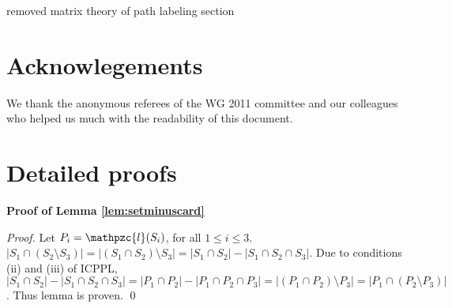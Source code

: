 \documentclass[a4paper,UKenglish,numberwithinsect]{lipics} %
\def\cl{\mathpzc{l}}
\def\lndisplay{1}
\begin{document}
{%
}{removed matrix theory of path labeling section}


\section {Acknowlegements} 
We thank the anonymous referees of the WG 2011 committee and our
colleagues who helped us much with the readability of this document.


%




\appendix

\section{Detailed proofs}
{\bf Proof of Lemma \ref{lem:setminuscard}}
\begin{proof}
  Let $P_i = \cl(S_i)$, for all $1 \le i \le  3$.
  $|S_1 \cap (S_2 \setminus S_3)| = |(S_1 \cap S_2) \setminus S_3| =
  |S_1 \cap S_2| - |S_1 \cap S_2 \cap S_3|$. Due to conditions (ii)
  and (iii) of ICPPL, $|S_1 \cap S_2| - |S_1 \cap S_2 \cap S_3| = |P_1
  \cap P_2| - |P_1 \cap P_2 \cap P_3| = |(P_1 \cap P_2) \setminus P_3|
  = |P_1 \cap (P_2 \setminus P_3)|$. Thus lemma is proven. \qed
\end{proof}
\end{document}

